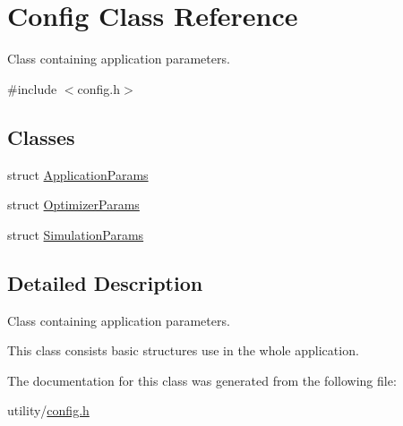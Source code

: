 \hypertarget{class_config}{}\section{Config Class Reference}
\label{class_config}


Class containing application parameters.  




{\ttfamily \#include $<$config.\+h$>$}

\subsection*{Classes}
\begin{DoxyCompactItemize}
\item 
struct \hyperlink{struct_config_1_1_application_params}{Application\+Params}
\item 
struct \hyperlink{struct_config_1_1_optimizer_params}{Optimizer\+Params}
\item 
struct \hyperlink{struct_config_1_1_simulation_params}{Simulation\+Params}
\end{DoxyCompactItemize}


\subsection{Detailed Description}
Class containing application parameters. 

This class consists basic structures use in the whole application. 

The documentation for this class was generated from the following file\+:\begin{DoxyCompactItemize}
\item 
utility/\hyperlink{config_8h}{config.\+h}\end{DoxyCompactItemize}
